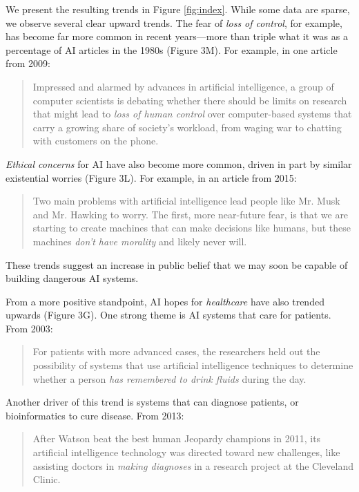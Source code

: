 \documentclass[letterpaper]{article}
\begin{document}
We present the resulting trends in Figure \ref{fig:index}. While some data are sparse, we observe several clear upward trends. The fear of \textit{loss of control}, for example, has become far more common in recent years---more than triple what it was as a percentage of AI articles in the 1980s (Figure 3M). For example, in one article from 2009: 
\begin{quote}
\small
Impressed and alarmed by advances in artificial intelligence, a group of computer scientists is debating whether there should be limits on research that might lead to \textit{loss of human control} over computer-based systems that carry a growing share of society's workload, from waging war to chatting with customers on the phone.
\normalsize
\end{quote}
\textit{Ethical concerns} for AI have also become more common, driven in part by similar existential worries (Figure 3L). For example, in an article from 2015: 
\begin{quote}
\small
Two main problems with artificial intelligence lead people like Mr. Musk and Mr. Hawking to worry. The first, more near-future fear, is that we are starting to create machines that can make decisions like humans, but these machines \textit{don't have morality} and likely never will.
\normalsize
\end{quote}
These trends suggest an increase in public belief that we may soon be capable of building dangerous AI systems.

From a more positive standpoint, AI hopes for \textit{healthcare} have also trended upwards (Figure 3G). One strong theme is AI systems that care for patients. From 2003:
\begin{quote}
\small
For patients with more advanced cases, the researchers held out the possibility of systems that use artificial intelligence techniques to determine whether a person \textit{has remembered to drink fluids} during the day.
\normalsize
\end{quote}
Another driver of this trend is systems that can diagnose patients, or bioinformatics to cure disease. From 2013: 
\begin{quote}
\small
After Watson beat the best human Jeopardy champions in 2011, its artificial intelligence technology was directed toward new challenges, like assisting doctors in \textit{making diagnoses} in a research project at the Cleveland Clinic.
\normalsize
\end{quote}
\end{document}
